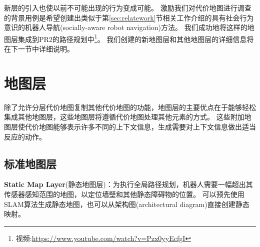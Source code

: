 新层的引入也使以前不可能出现的行为变成可能。
激励我们对代价地图进行调查的背景用例是希望创建出类似于第\ref{sec:relatework}节相关工作介绍的具有社会行为意识的机器人导航(socially-aware robot navigation)方法。 
我们成功地将这样的地图层集成到PR2的路径规划中\footnote{视频:\url{https://www.youtube.com/watch?v=Pzx0yyEcfgI}}。 
我们创建的新地图层和其他地图层的详细信息将在下一节中详细说明。

\section{地图层}\label{sec:layers}

除了允许分层代价地图复制其他代价地图的功能，地图层的主要优点在于能够轻松集成其他地图层，这些地图层将遵循代价地图处理其他元素的方式。 这些附加地图层使代价地图能够表示许多不同的上下文信息，生成需要对上下文信息做出适当反应的动作。

\subsection{标准地图层}
\textbf{\color{blue}Static Map Layer}(静态地图层)：为执行全局路径规划，机器人需要一幅超出其传感器感知范围的地图，以定位墙壁和其他静态障碍物的位置。 
可以预先使用SLAM算法生成静态地图，也可以从架构图(architectural diagram)直接创建静态映射。

